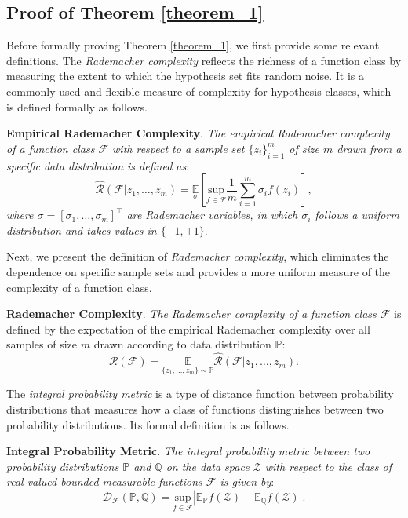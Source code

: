 \subsection{Proof of Theorem \ref{theorem_1}}
Before formally proving Theorem \ref{theorem_1}, we first provide some relevant definitions. The \textit{Rademacher complexity} \cite{mohri2018foundations} reflects the richness of a function class by measuring the extent to which the hypothesis set fits random noise. It is a commonly used and flexible measure of complexity for hypothesis classes, which is defined formally as follows.
\begin{definition}
    \textbf{Empirical Rademacher Complexity}. \textit{The empirical Rademacher complexity of a function class $\mathcal{F}$ with respect to a sample set $\{z_i\}_{i=1}^m$ of size $m$ drawn from a specific data distribution is defined as}:
    \begin{equation}
        \hat{\mathcal{R}}(\mathcal{F}|z_1,\dots,z_m)=\underset{\sigma}{\mathbb{E}}\left[\underset{f\in\mathcal{F}}{\text{sup}}\frac{1}{m}\sum_{i=1}^m\sigma_if(z_i)\right],
    \end{equation}
\textit{where $\sigma=[\sigma_1,\dots,\sigma_m]^\top$ are Rademacher variables, in which $\sigma_i$ follows a uniform distribution and takes values in $\{-1,+1\}$}.
\end{definition}

Next, we present the definition of \textit{Rademacher complexity}, which eliminates the dependence on specific sample sets and provides a more uniform measure of the complexity of a function class.

\begin{definition}
    \textbf{Rademacher Complexity}. \textit{The Rademacher complexity of a function class $\mathcal{F}$} is defined by the expectation of the empirical Rademacher complexity over all samples of size $m$ drawn according to data distribution $\mathbb{P}$:
    \begin{equation}
        \mathcal{R}(\mathcal{F})=\underset{\{z_1,\dots,z_m\}\sim \mathbb{P}}{\mathbb{E}}\hat{\mathcal{R}}(\mathcal{F}|z_1,\dots,z_m).
    \end{equation}
\end{definition}


The \textit{integral probability metric} \cite{muller1997integral} is a type of distance function between probability distributions that measures how a class of functions distinguishes between two probability distributions. Its formal definition is as follows.
\begin{definition}
    \textbf{Integral Probability Metric}. \textit{The integral probability metric between two probability distributions $\mathbb{P}$ and $\mathbb{Q}$ on the data space $\mathcal{Z}$ with respect to the class of real-valued bounded measurable functions $\mathcal{F}$ is given by}:
    \begin{equation}
        \mathcal{D}_\mathcal{F}(\mathbb{P},\mathbb{Q})=\underset{f\in\mathcal{F}}{\text{sup}}\left|\mathbb{E}_\mathbb{P}f(\mathcal{Z})-\mathbb{E}_\mathbb{Q}f(\mathcal{Z})\right|.
    \end{equation}
\end{definition}

